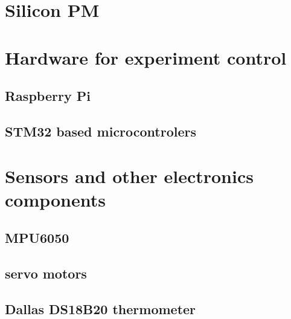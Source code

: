 
\section{Silicon PM}


\section{Hardware for experiment control}
\subsection{Raspberry Pi}

\subsection{STM32 based microcontrolers}

\section{Sensors and other electronics components}

\subsection{MPU6050}

\subsection{servo motors}

\subsection{Dallas DS18B20 thermometer}
